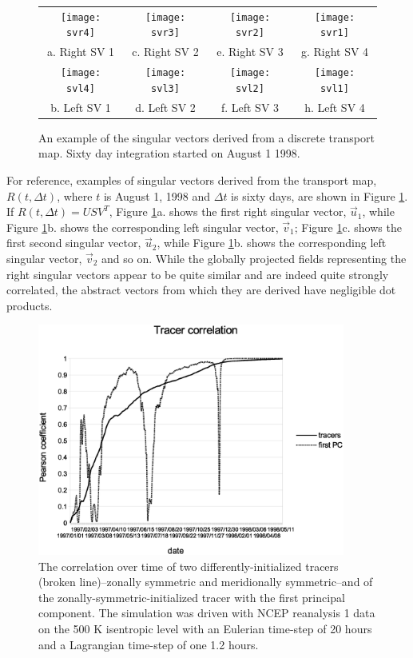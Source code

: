 \documentclass{article}
\begin{document}
\begin{figure}
  \begin{tabular}{cccc}
    \texttt{[image: svr4]} &
    \texttt{[image: svr3]} &
    \texttt{[image: svr2]} &
    \texttt{[image: svr1]} \\
    a. Right SV 1 & c. Right SV 2 & e. Right SV 3 & g. Right SV 4 \\
    \texttt{[image: svl4]} &
    \texttt{[image: svl3]} &
    \texttt{[image: svl2]} &
    \texttt{[image: svl1]} \\
    b. Left SV 1 & d. Left SV 2 & f. Left SV 3 & h. Left SV 4
  \end{tabular}
  \caption{An example of the singular vectors derived from a discrete transport map.
  Sixty day integration started on August 1 1998.}
  \label{sample_SV}
\end{figure}

For reference, examples of singular vectors derived from the transport map,
$R(t, \Delta t)$, where $t$ is August 1, 1998 and $\Delta t$ is sixty days,
are shown in Figure \ref{sample_SV}.
If $R(t, \Delta t)=U S V^T$,
Figure \ref{sample_SV}a. shows the first right singular vector, $\vec u_1$,
while Figure \ref{sample_SV}b. shows the corresponding left singular vector,
$\vec v_1$;
Figure \ref{sample_SV}c. shows the first second singular vector, $\vec u_2$,
while Figure \ref{sample_SV}b. shows the corresponding left singular vector,
$\vec v_2$
and so on.
While the globally projected fields representing the right singular vectors 
appear to be quite similar and are indeed
quite strongly correlated, the abstract vectors from which they are derived
have negligible dot products.

\begin{figure}
\begin{center}
\includegraphics[width=0.9\textwidth]{tracer_correlation.eps}
\caption{The correlation over time of two differently-initialized tracers
(broken line)--zonally symmetric and meridionally symmetric--and of
the zonally-symmetric-initialized tracer with the first principal component.
The simulation was driven with NCEP reanalysis 1 data on the 500 K isentropic
level with an Eulerian time-step of 20 hours and a Lagrangian time-step
of one 1.2 hours.}\label{tcorr}
\end{center}
\end{figure}
\end{document}
